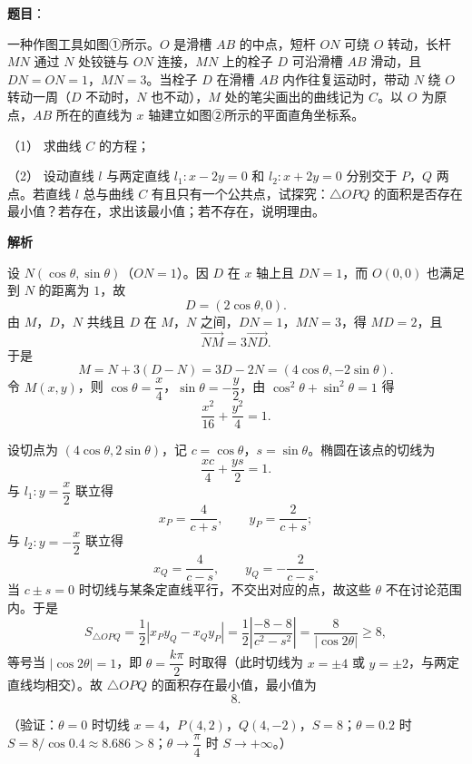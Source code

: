 \begin{answer}

\textbf{题目}：

一种作图工具如图①所示。\(O\) 是滑槽 \(AB\) 的中点，短杆 \(ON\) 可绕 \(O\) 转动，长杆 \(MN\) 通过 \(N\) 处铰链与 \(ON\) 连接，\(MN\) 上的栓子 \(D\) 可沿滑槽 \(AB\) 滑动，且 \(DN=ON=1\)，\(MN=3\)。当栓子 \(D\) 在滑槽 \(AB\) 内作往复运动时，带动 \(N\) 绕 \(O\) 转动一周（\(D\) 不动时，\(N\) 也不动），\(M\) 处的笔尖画出的曲线记为 \(C\)。以 \(O\) 为原点，\(AB\) 所在的直线为 \(x\) 轴建立如图②所示的平面直角坐标系。

（1） 求曲线 \(C\) 的方程；

（2） 设动直线 \(l\) 与两定直线 \(l_1:x-2y=0\) 和 \(l_2:x+2y=0\) 分别交于 \(P\)，\(Q\) 两点。若直线 \(l\) 总与曲线 \(C\) 有且只有一个公共点，试探究：\(\triangle OPQ\) 的面积是否存在最小值？若存在，求出该最小值；若不存在，说明理由。
\nopagebreak[4]
\begin{center}\end{center}
\nopagebreak[4]
\textbf{解析}


设 \(N(\cos\theta,\sin\theta)\)（\(ON=1\)）。因 \(D\) 在 \(x\) 轴上且 \(DN=1\)，而 \(O(0,0)\) 也满足到 \(N\) 的距离为 \(1\)，故
\nopagebreak[4]
\[
D=(2\cos\theta,0).
\]
由 \(M\)，\(D\)，\(N\) 共线且 \(D\) 在 \(M\)，\(N\) 之间，\(DN=1\)，\(MN=3\)，得 \(MD=2\)，且
\nopagebreak[4]
\[
\overrightarrow{NM}=3\overrightarrow{ND}.
\]
于是
\nopagebreak[4]
\[
M=N+3(D-N)=3D-2N=(4\cos\theta,-2\sin\theta).
\]
令 \(M(x,y)\)，则 \(\cos\theta=\dfrac x4\)，\(\sin\theta=-\dfrac y2\)，由 \(\cos^2\theta+\sin^2\theta=1\) 得
\nopagebreak[4]
\[
\frac{x^2}{16}+\frac{y^2}{4}=1.
\]


设切点为 \((4\cos\theta,2\sin\theta)\)，记 \(c=\cos\theta\)，\(s=\sin\theta\)。椭圆在该点的切线为
\nopagebreak[4]
\[
\frac{xc}{4}+\frac{ys}{2}=1.
\]
与 \(l_1:y=\dfrac x2\) 联立得
\nopagebreak[4]
\[
x_P=\frac{4}{c+s},\qquad y_P=\frac{2}{c+s};
\]
与 \(l_2:y=-\dfrac x2\) 联立得
\nopagebreak[4]
\[
x_Q=\frac{4}{c-s},\qquad y_Q=-\frac{2}{c-s}.
\]
当 \(c\pm s=0\) 时切线与某条定直线平行，不交出对应的点，故这些 \(\theta\) 不在讨论范围内。于是
\nopagebreak[4]
\[
S_{\triangle OPQ}=\frac12\left|x_Py_Q-x_Qy_P\right|
=\frac12\left|\frac{-8-8}{c^2-s^2}\right|
=\frac{8}{|\cos2\theta|}\geqslant8,
\]
等号当 \(|\cos2\theta|=1\)，即 \(\theta=\dfrac{k\pi}{2}\) 时取得（此时切线为 \(x=\pm4\) 或 \(y=\pm2\)，与两定直线均相交）。故 \(\triangle OPQ\) 的面积存在最小值，最小值为
\nopagebreak[4]
\[
8.
\]

（验证：\(\theta=0\) 时切线 \(x=4\)，\(P(4,2)\)，\(Q(4,-2)\)，\(S=8\)；\(\theta=0.2\) 时 \(S=8/\cos0.4\approx8.686>8\)；\(\theta\to\dfrac{\pi}{4}\) 时 \(S\to+\infty\)。）



\end{answer}